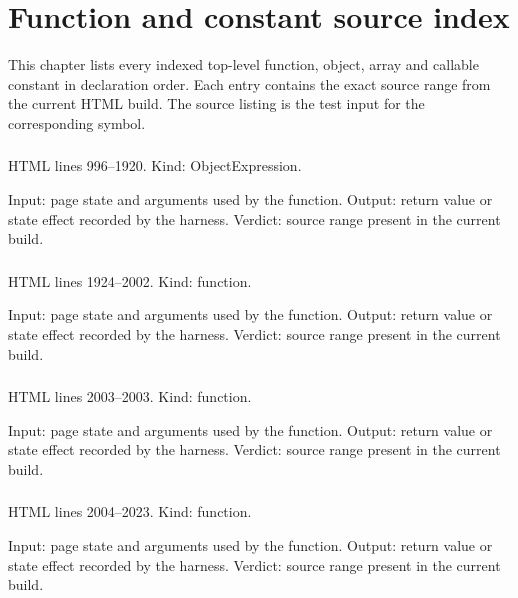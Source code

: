 \chapter{Function and constant source index}
\label{ch:val-functions}

This chapter lists every indexed top-level function, object, array and callable constant in declaration order. Each entry contains the exact source range from the current HTML build. The source listing is the test input for the corresponding symbol.

\subsection*{\texttt{}}
\label{vf_1_ZH_TERMS}
HTML lines 996--1920. Kind: ObjectExpression.

Input: page state and arguments used by the function.
Output: return value or state effect recorded by the harness.
Verdict: source range present in the current build.

\subsection*{\texttt{}}
\label{vf_2_zhPhrase}
HTML lines 1924--2002. Kind: function.

Input: page state and arguments used by the function.
Output: return value or state effect recorded by the harness.
Verdict: source range present in the current build.

\subsection*{\texttt{}}
\label{vf_3_ui}
HTML lines 2003--2003. Kind: function.

Input: page state and arguments used by the function.
Output: return value or state effect recorded by the harness.
Verdict: source range present in the current build.

\subsection*{\texttt{}}
\label{vf_4_localizeDOM}
HTML lines 2004--2023. Kind: function.

Input: page state and arguments used by the function.
Output: return value or state effect recorded by the harness.
Verdict: source range present in the current build.

